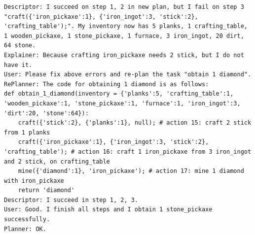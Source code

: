 \begin{lstlisting}
Descriptor: I succeed on step 1, 2 in new plan, but I fail on step 3 "craft({'iron_pickaxe':1}, {'iron_ingot':3, 'stick':2}, 'crafting_table');". My inventory now has 5 planks, 1 crafting_table, 1 wooden_pickaxe, 1 stone_pickaxe, 1 furnace, 3 iron_ingot, 20 dirt, 64 stone.
Explainer: Because crafting iron_pickaxe needs 2 stick, but I do not have it.
User: Please fix above errors and re-plan the task "obtain 1 diamond".
RePlanner: The code for obtaining 1 diamond is as follows:
def obtain_1_diamond(inventory = {'planks':5, 'crafting_table':1, 'wooden_pickaxe':1, 'stone_pickaxe':1, 'furnace':1, 'iron_ingot':3, 'dirt':20, 'stone':64}):
    craft({'stick':2}, {'planks':1}, null); # action 15: craft 2 stick from 1 planks 
    craft({'iron_pickaxe':1}, {'iron_ingot':3, 'stick':2}, 'crafting_table'); # action 16: craft 1 iron_pickaxe from 3 iron_ingot and 2 stick, on crafting_table
    mine({'diamond':1}, 'iron_pickaxe'); # action 17: mine 1 diamond with iron_pickaxe
    return 'diamond'
Descriptor: I succeed in step 1, 2, 3. 
User: Good. I finish all steps and I obtain 1 stone_pickaxe successfully.
Planner: OK.
\end{lstlisting}


